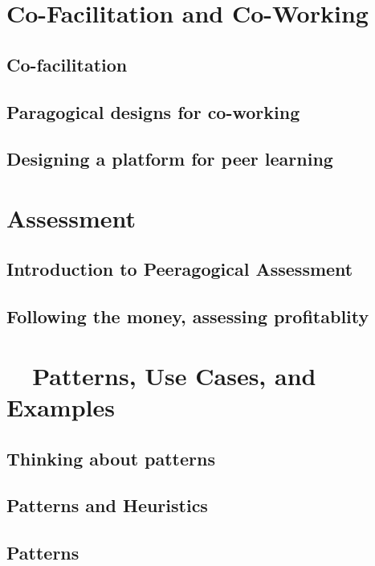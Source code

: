 \documentclass[ebook, 12pt, twoside]{memoir}
\begin{document}
\part{Co-Facilitation and Co-Working} %
%
\chapter[\textbf{Co-facilitation}]{Co-facilitation}

%
\chapter[\textbf{Designs for co-working}]{ Paragogical designs for co-working }
%

%
\chapter[\textbf{Platform design}]{ Designing a platform for peer learning  }
%

%
\part{Assessment} %
%
\chapter[\textbf{Peeragogical Assessment}]{Introduction to Peeragogical Assessment}

%
\chapter[\textbf{Following the money}]{ Following the money, assessing profitablity}
%

%
\part{~~Patterns, Use Cases, and Examples}  %
%
\chapter[\textbf{Thinking about patterns}]{Thinking about patterns}

%
\chapter[\textbf{Patterns and Heuristics}]{Patterns and Heuristics}
%

%
\chapter[\textbf{Patterns}]{ Patterns }
\end{document}
